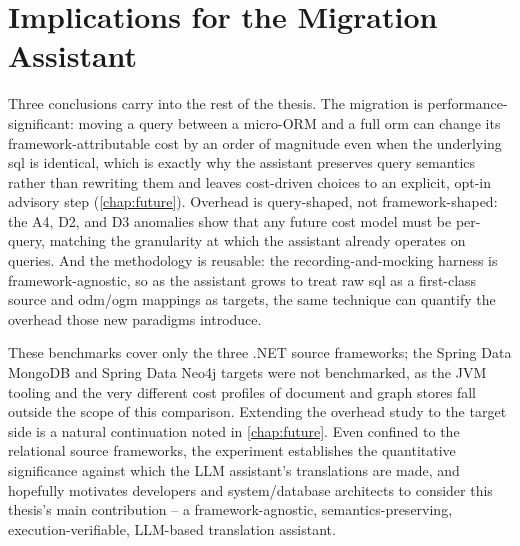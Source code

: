 \section{Implications for the Migration Assistant}
\label{sec:overhead-implications}

Three conclusions carry into the rest of the thesis. The migration is performance-significant: moving a query between a micro-ORM and a full \acrshort{orm} can change its framework-attributable cost by an order of magnitude even when the underlying \acrshort{sql} is identical, which is exactly why the assistant preserves query semantics rather than rewriting them and leaves cost-driven choices to an explicit, opt-in advisory step (\cref{chap:future}). Overhead is query-shaped, not framework-shaped: the A4, D2, and D3 anomalies show that any future cost model must be per-query, matching the granularity at which the assistant already operates on queries. And the methodology is reusable: the recording-and-mocking harness is framework-agnostic, so as the assistant grows to treat raw \acrshort{sql} as a first-class source and \acrshort{odm}/\acrshort{ogm} mappings as targets, the same technique can quantify the overhead those new paradigms introduce.

These benchmarks cover only the three .NET source frameworks; the Spring Data MongoDB and Spring Data Neo4j targets were not benchmarked, as the JVM tooling and the very different cost profiles of document and graph stores fall outside the scope of this comparison. Extending the overhead study to the target side is a natural continuation noted in \cref{chap:future}. Even confined to the relational source frameworks, the experiment establishes the quantitative significance against which the LLM assistant's translations are made, and hopefully motivates developers and system/database architects to consider this thesis's main contribution -- a framework-agnostic, semantics-preserving, execution-verifiable, LLM-based translation assistant.